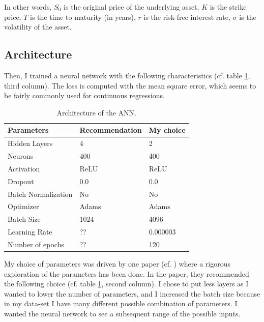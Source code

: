 In other words, $S_0$ is the original price of the underlying asset, $K$ is the strike price, $T$ is the time to maturity (in years), $r$ is the risk-free interest rate, $\sigma$ is the volatility of the asset.



\subsection{Architecture}

Then, I trained a neural network with the following characteristics  (cf. table \ref{table:architecture_ANN}, third column). The loss is computed with the mean square error, which seems to be fairly commonly used for continuous regressions. 

\begin{table}
\begin{center}
\begin{tabular}{   m{4.5 cm} | m{4.5 cm} | m{4.5 cm}   } 
\hline
 Parameters & Recommendation & My choice \\ 
\hline
\hline
Hidden Layers & $4$ & 2 \\
\hline
Neurons & $400$ & 400 \\
\hline
Activation & ReLU & ReLU \\
\hline
Dropout &$ 0.0$ & 0.0 \\
\hline
Batch Normalization & No &  No\\
\hline
Optimizer &  Adams & Adams \\
\hline
Batch Size & $1024$ & 4096 \\
\hline
Learning Rate & ?? & 0.000003 \\
\hline
Number of epochs & ?? &  120 \\
\hline
\end{tabular}
\caption{Architecture of the ANN.}
\label{table:architecture_ANN}
\end{center}
\end{table}

My choice of parameters was driven by one paper (cf. \cite{neuralnetworks1}) where a rigorous exploration of the parameters has been done. In the paper, they recommended the following choice (cf. table \ref{table:architecture_ANN}, second column). I chose to put less layers as I wanted to lower the number of parameters, and I increased the batch size because in my data-set I have many different possible combination of parameters. I wanted the neural network to see a subsequent range of the possible inputs.







